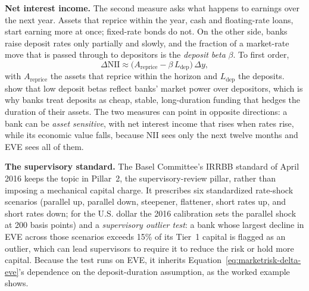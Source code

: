 \documentclass[../ai_in_finance]{subfiles}
\begin{document}
\textbf{Net interest income.} The second measure asks what happens to earnings over the next year. Assets that reprice within the year, cash and floating-rate loans, start earning more at once; fixed-rate bonds do not. On the other side, banks raise deposit rates only partially and slowly, and the fraction of a market-rate move that is passed through to depositors is the \emph{deposit beta} $\beta$. To first order,
\begin{equation}
\label{eq:marketrisk-delta-nii}
\Delta \text{NII} \approx \big(A_{\text{reprice}} - \beta\, L_{\text{dep}}\big)\,\Delta y,
\end{equation}
with $A_{\text{reprice}}$ the assets that reprice within the horizon and $L_{\text{dep}}$ the deposits. \textcite{drechsler2017deposits} show that low deposit betas reflect banks' market power over depositors, which is why banks treat deposits as cheap, stable, long-duration funding that hedges the duration of their assets. The two measures can point in opposite directions: a bank can be \emph{asset sensitive}, with net interest income that rises when rates rise, while its economic value falls, because NII sees only the next twelve months and EVE sees all of them.

\textbf{The supervisory standard.} The Basel Committee's IRRBB standard of April 2016 \parencite{bcbs2016irrbb} keeps the topic in Pillar~2, the supervisory-review pillar, rather than imposing a mechanical capital charge. It prescribes six standardized rate-shock scenarios (parallel up, parallel down, steepener, flattener, short rates up, and short rates down; for the U.S. dollar the 2016 calibration sets the parallel shock at 200 basis points) and a \emph{supervisory outlier test}: a bank whose largest decline in EVE across those scenarios exceeds 15\% of its Tier~1 capital is flagged as an outlier, which can lead supervisors to require it to reduce the risk or hold more capital. Because the test runs on EVE, it inherits Equation~\eqref{eq:marketrisk-delta-eve}'s dependence on the deposit-duration assumption, as the worked example shows.

\end{document}
